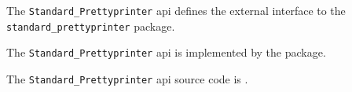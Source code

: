 
The {\tt Standard\_Prettyprinter} api defines the external interface to the {\tt standard\_prettyprinter} package.

The {\tt Standard\_Prettyprinter} api is implemented by the  package.

The {\tt Standard\_Prettyprinter} api source code is .


